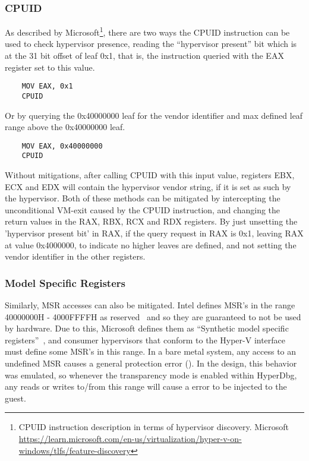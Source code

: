 \subsubsection{CPUID}
As described by Microsoft\footnote{CPUID instruction description in terms of hypervisor discovery. Microsoft \url{https://learn.microsoft.com/en-us/virtualization/hyper-v-on-windows/tlfs/feature-discovery}}, 
there are two ways the CPUID instruction can be used to check hypervisor presence, reading the “hypervisor present” bit which is at the 31 bit offset of leaf 0x1, that is, the instruction queried with the EAX register set to this value.
\begin{verbatim}
    MOV EAX, 0x1
    CPUID
\end{verbatim}
Or by querying the 0x40000000 leaf for the vendor identifier and max defined leaf range above the 0x40000000 leaf. 
\begin{verbatim}
    MOV EAX, 0x40000000
    CPUID
\end{verbatim}
Without mitigations, after calling CPUID with this input value, registers EBX, ECX and EDX will contain the hypervisor vendor string, if it is set as such by the hypervisor.
Both of these methods can be mitigated by intercepting the unconditional VM-exit caused by the CPUID instruction, and changing the return values in the RAX, RBX, RCX and RDX registers. 
By just unsetting the 'hypervisor present bit' in RAX, if the query request in RAX is 0x1, leaving RAX at value 0x4000000, to indicate no higher leaves are defined, and not setting the vendor identifier in the other registers.

\subsubsection{Model Specific Registers}
Similarly, MSR accesses can also be mitigated. Intel defines MSR's in the range 40000000H - 4000FFFFH as reserved~\cite[Volume 4]{Intel-SDM2025} and so they are guaranteed to not be used by hardware. 
Due to this, Microsoft defines them as “Synthetic model specific registers”~\cite{microsoft_hv_interface_reqs}, and consumer hypervisors that conform to the Hyper-V  interface must define some MSR's in this range. 
In a bare metal system, any access to an undefined MSR causes a general protection error (). In the design, this behavior was emulated, 
so whenever the transparency mode is enabled within HyperDbg, any reads or writes to/from this range will cause a  error to be injected to the guest.

